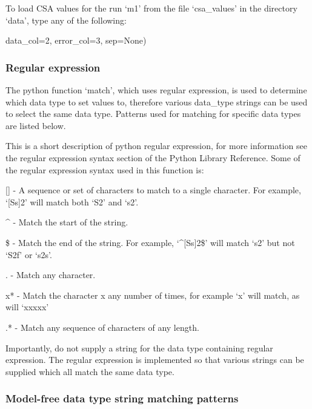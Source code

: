 To load CSA values for the run `m1' from the file `csa\_values' in the directory `data', type
any of the following:


                  data\_col=2, error\_col=3, sep=None)




\subsubsection{Regular expression}

The python function `match', which uses regular expression, is used to determine which data
type to set values to, therefore various data\_type strings can be used to select the same
data type.  Patterns used for matching for specific data types are listed below.

This is a short description of python regular expression, for more information see the
regular expression syntax section of the Python Library Reference.  Some of the regular
expression syntax used in this function is:

    [] - A sequence or set of characters to match to a single character.  For example,
    `[Ss]2' will match both `S2' and `s2'.

    \^{} - Match the start of the string.

    \$ - Match the end of the string.  For example, `\^{}[Ss]2\$' will match `s2' but not `S2f'
    or `s2s'.

    . - Match any character.

    x* - Match the character x any number of times, for example `x' will match, as will
    `xxxxx'

    .* - Match any sequence of characters of any length.

Importantly, do not supply a string for the data type containing regular expression.  The
regular expression is implemented so that various strings can be supplied which all match
the same data type.


\subsubsection{Model-free data type string matching patterns}




